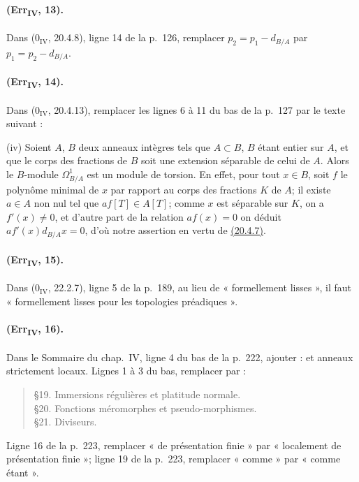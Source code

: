 \paragraph{(Err\textsubscript{IV}, 13).}
Dans ($0_{\mathrm{IV}}$, 20.4.8), ligne 14 de la p.~126, remplacer
$p_2=p_1-d_{B/A}$ par $p_1=p_2-d_{B/A}$.

\paragraph{(Err\textsubscript{IV}, 14).}
Dans ($0_{\mathrm{IV}}$, 20.4.13), remplacer les lignes 6 à 11 du bas
de la p.~127 par le texte suivant :

\medskip
\noindent
(iv) Soient $A$, $B$ deux anneaux intègres tels que $A\subset B$, $B$
étant entier sur $A$, et que le corps des fractions de $B$ soit une
extension séparable de celui de $A$. Alors le $B$-module
$\Omega^1_{B/A}$ est un module de torsion. En effet, pour tout $x\in B$,
soit $f$ le polynôme minimal de $x$ par rapport au corps des fractions
$K$ de $A$; il existe $a\in A$ non nul tel que $af[T]\in A[T]$; comme
$x$ est séparable sur $K$, on a $f'(x)\neq0$, et d'autre part de la
relation $af(x)=0$ on déduit $af'(x)d_{B/A}x=0$, d'où notre assertion
en vertu de {\hyperlink{ega4.c04.cor.20-4-7}{(20.4.7)}}.

\paragraph{(Err\textsubscript{IV}, 15).}
Dans ($0_{\mathrm{IV}}$, 22.2.7), ligne 5 de la p.~189, au lieu de
« formellement lisses », il faut « formellement lisses pour les
topologies préadiques ».

\paragraph{(Err\textsubscript{IV}, 16).}
Dans le Sommaire du chap.~IV, ligne 4 du bas de la p.~222, ajouter :
et anneaux strictement locaux. Lignes 1 à 3 du bas, remplacer par :
\begin{quote}
\S19. Immersions régulières et platitude normale.\\
\S20. Fonctions méromorphes et pseudo-morphismes.\\
\S21. Diviseurs.
\end{quote}
Ligne 16 de la p.~223, remplacer « de présentation finie » par
« localement de présentation finie »; ligne 19 de la p.~223, remplacer
« comme » par « comme étant ».


